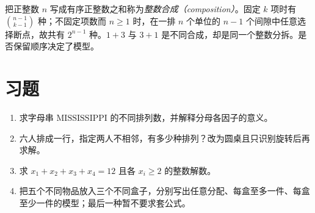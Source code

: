 把正整数 $n$ 写成有序正整数之和称为\emph{整数合成（composition）}。固定 $k$ 项时有 $\binom{n-1}{k-1}$ 种；不固定项数而 $n\ge1$ 时，在一排 $n$ 个单位的 $n-1$ 个间隙中任意选择断点，故共有 $2^{n-1}$ 种。$1+3$ 与 $3+1$ 是不同合成，却是同一个整数分拆。是否保留顺序决定了模型。

\section{习题}
\begin{enumerate}
  \item\label{ex:elementary-counting-1} 求字母串 $\mathrm{MISSISSIPPI}$ 的不同排列数，并解释分母各因子的意义。
  \item\label{ex:elementary-counting-2} 六人排成一行，指定两人不相邻，有多少种排列？改为圆桌且只识别旋转后再求解。
  \item\label{ex:elementary-counting-3} 求 $x_1+x_2+x_3+x_4=12$ 且各 $x_i\ge2$ 的整数解数。
  \item\label{ex:elementary-counting-4} 把五个不同物品放入三个不同盒子，分别写出任意分配、每盒至多一件、每盒至少一件的模型；最后一种暂不要求套公式。
\end{enumerate}

